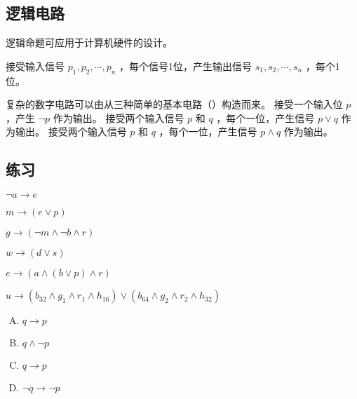 {    \subsection{逻辑电路}
    {
        逻辑命题可应用于计算机硬件的设计。

        接受输入信号 $p_1, p_2, \cdots, p_n$ ，每个信号1位，产生输出信号 $s_1, s_2, \cdots, s_n$ ，每个1位。

        复杂的数字电路可以由从三种简单的基本电路（）构造而来。
        接受一个输入位 $p$ ，产生 $\neg p$ 作为输出。
        接受两个输入信号 $p$ 和 $q$ ，每个一位，产生信号 $p \vee q$ 作为输出。
        接受两个输入信号 $p$ 和 $q$ ，每个一位，产生信号 $p \wedge q$ 作为输出。
    }

    \subsection{练习}
    {
        \begin{practices}
            $\neg a \rightarrow e$
        \end{practices}

        \begin{practices}
            $m \rightarrow (e \vee p)$
        \end{practices}

        \begin{practices}
            $g \rightarrow (\neg m \wedge \neg b \wedge r)$
        \end{practices}

        \begin{practices}
            $w \rightarrow (d \vee s)$
        \end{practices}

        \begin{practices}
            $e \rightarrow (a \wedge (b \vee p) \wedge r)$
        \end{practices}

        \begin{practices}
            $u \rightarrow (b_{32} \wedge g_{1} \wedge r_{1} \wedge h_{16}) \vee (b_{64} \wedge g_{2} \wedge r_{2} \wedge h_{32})$
        \end{practices}

        \begin{practices}
            \begin{enumerate}[A.]
                \item $q \rightarrow p$
                \item $q \wedge \neg p$
                \item $q \rightarrow p$
                \item $\neg q \rightarrow \neg p$
            \end{enumerate}
        \end{practices}

}}

